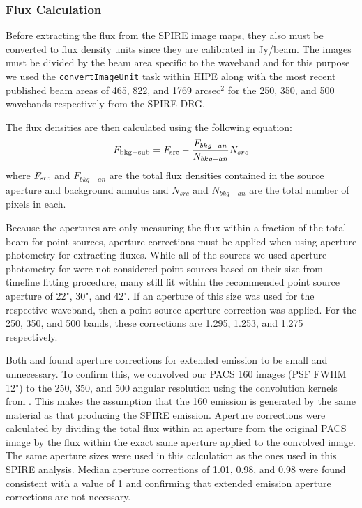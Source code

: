 \subsubsection{Flux Calculation}
Before extracting the flux from the SPIRE image maps, they also must be converted to flux density units since they are calibrated in Jy/beam. The images must be divided by the beam area specific to the waveband and for this purpose we used the \texttt{convertImageUnit} task within HIPE along with the most recent published beam areas of 465, 822, and 1769 arcsec$^{2}$ for the 250, 350, and 500 \um{} wavebands respectively from the SPIRE DRG.

The flux densities are then calculated using the following equation:
\begin{equation}
F_{\rm{bkg-sub}} = F_{\rm{src}} - \frac{F_{bkg-an}}{N_{bkg-an}}N_{src}
\end{equation}
where $F_{\rm{src}}$ and $F_{bkg-an}$ are the total flux densities contained in the source aperture and background annulus and $N_{src}$ and $N_{bkg-an}$ are the total number of pixels in each.

Because the apertures are only measuring the flux within a fraction of the total beam for point sources, aperture corrections must be applied when using aperture photometry for extracting fluxes. While all of the sources we used aperture photometry for were not considered point sources based on their size from timeline fitting procedure, many still fit within the recommended point source aperture of 22", 30", and 42". If an aperture of this size was used for the respective waveband, then a point source aperture correction was applied. For the 250, 350, and 500 \um{} bands, these corrections are 1.295, 1.253, and 1.275 respectively. 

Both \citet{Ciesla:2012lq} and \citet{Dale:2012dq} found aperture corrections for extended emission to be small and unnecessary.  To confirm this, we convolved our PACS 160 \um{} images (PSF FWHM 12") to the 250, 350, and 500 \um{} angular resolution using the convolution kernels from \citet{Aniano:2011rr}. This makes the assumption that the 160 \um{} emission is generated by the same material as that producing the SPIRE emission. Aperture corrections were calculated by dividing the total flux within an aperture from the original PACS image by the flux within the exact same aperture applied to the convolved image. The same aperture sizes were used in this calculation as the ones used in this SPIRE analysis. Median aperture corrections of 1.01, 0.98, and 0.98 were found consistent with a value of 1 and confirming that extended emission aperture corrections are not necessary.